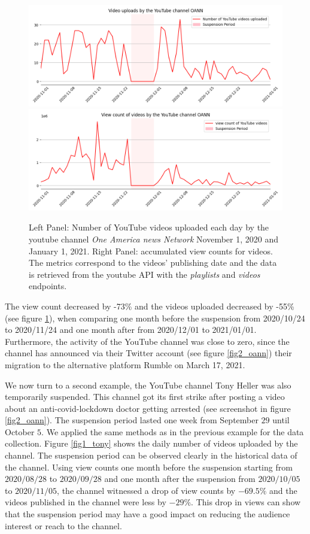 \documentclass{article}
\begin{document}
\begin{figure}[h]
\hspace{-2em}
		\includegraphics[scale=0.32]{../figure/OANN_videos_yt.png}
		\includegraphics[scale=0.32]{../figure/OANN_views_yt.png} 
	\caption{Left Panel: Number of YouTube videos uploaded each day by the youtube channel {\it One America news Network} November 1, 2020 and January 1, 2021. Right Panel: accumulated view counts for videos. The metrics correspond to the videos’  publishing date and the data is retrieved from the youtube API with the {\it playlists} and  {\it videos} endpoints. }
	\label{fig1_oann}
\end{figure}


The view count decreased by -73\% and the videos uploaded decreased by -55\% (see figure \ref{fig1_oann}), when comparing one month before the suspension from 2020/10/24 to 2020/11/24 and one month after from 2020/12/01 to 2021/01/01. Furthermore, the activity of the YouTube channel was close to zero, since the channel has announced via their Twitter account (see figure \ref{fig2_oann}) their migration to the alternative platform Rumble on March 17, 2021.

\smallskip

We now turn to a
second example, the YouTube channel Tony Heller was also temporarily suspended. 
This channel got its first strike after posting a video about an anti-covid-lockdown doctor getting arrested (see screenshot in figure \ref{fig2_oann}). The suspension period lasted one week from September $29$ until October $5$.
We applied the same methods as in the previous example for the data collection. Figure \ref{fig1_tony} shows the daily number of videos uploaded by the channel. The suspension period can be observed clearly in the historical data of the channel.  
Using view counts one month before the suspension starting from $2020/08/28$ to $2020/09/28$ and one month after the suspension from $2020/10/05$ to $2020/11/05$, the channel witnessed a drop of view counts by $-69.5\%$ and the videos published in the channel were less by $-29\%$. This drop in views can show that the  suspension  period
may  have  a  good  impact  on  reducing  the  audience interest or reach to the channel.
\end{document}
